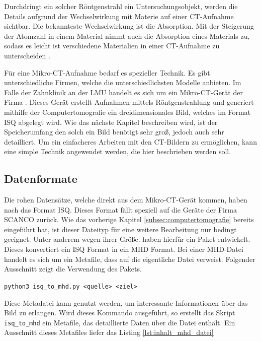 Durchdringt ein solcher Röntgenstrahl ein Untersuchungsobjekt, werden die
Details aufgrund der Wechselwirkung mit Materie auf einer \ac{CT}-Aufnahme sichtbar.
Die bekannteste Wechselwirkung ist die Absorption. Mit der Steigerung der Atomzahl
in einem Material nimmt auch die Absorption eines Materials zu, sodass es leicht
ist verschiedene Materialien in einer \ac{CT}-Aufnahme zu unterscheiden \citep[vgl.][K.~1]{nib2024}.

Für eine Mikro-\ac{CT}-Aufnahme bedarf es spezieller Technik. Es gibt
unterschiedliche Firmen, welche die unterschiedlichsten Modelle anbieten. Im
Falle der Zahnklinik an der \ac{LMU} handelt es sich um ein Mikro-\ac{CT}-Gerät
der Firma \citet{scanco2024}. Dieses Gerät erstellt Aufnahmen mittels
Röntgenstrahlung und generiert mithilfe der Computertomografie ein
dreidimensionales Bild, welches im Format \ac{ISQ} abgelegt wird. Wie das nächste
Kapitel beschreiben wird, ist der Speicherumfang den solch ein Bild benötigt
sehr groß, jedoch auch sehr detailliert. Um ein einfacheres Arbeiten mit den \ac{CT}-Bildern
zu ermöglichen, kann eine simple Technik angewendet werden, die hier beschrieben
werden soll.

\subsection{Datenformate}
\label{subsec:datensätze} Die rohen Datensätze, welche direkt aus dem Mikro-\ac{CT}-Gerät
kommen, haben nach \citet{scanco2024} das Format \ac{ISQ}. Dieses Format fällt speziell
auf die Geräte der Firma SCANCO zurück. Wie das vorherige Kapitel
\ref{subsec:computertomografie} bereits eingeführt hat, ist dieser Dateityp für eine
weitere Bearbeitung nur bedingt geeignet. Unter anderem wegen ihrer Größe. \citet[S.~118-119]{RoeschKunzelmann2018}
haben hierfür ein Paket entwickelt. Dieses konvertiert ein \ac{ISQ} Format in
ein \ac{MHD} Format. Bei einer \ac{MHD}-Datei handelt es sich um ein Metafile,
dass auf die eigentliche Datei verweist. Folgender Ausschnitt zeigt die Verwendung
des Pakets.
\begin{center}
	\texttt{python3 isq\_to\_mhd.py <quelle> <ziel>}
\end{center}
Diese Metadatei kann genutzt werden, um interessante Informationen über das Bild
zu erlangen. Wird dieses Kommando ausgeführt, so erstellt das Skript \texttt{isq\_to\_mhd}
ein Metafile, das detaillierte Daten über die Datei enthält. Ein Ausschnitt
dieses Metafiles liefer das Listing \ref{lst:inhalt_mhd_datei}

